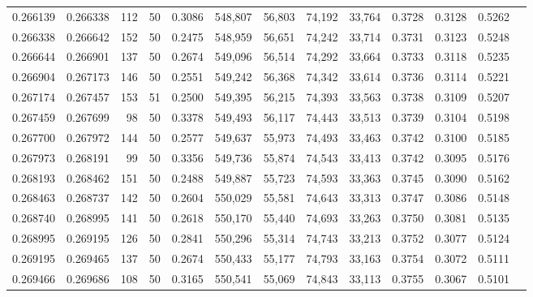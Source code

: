 \begin{tabular}{rrrrrrrrrrrrr}
0.266139 & 0.266338 &   112 &  50 &                                     0.3086 & 548,807 &  56,803 &  74,192 &  33,764 & 0.3728 & 0.3128 & 0.5262 \\
0.266338 & 0.266642 &   152 &  50 &                                     0.2475 & 548,959 &  56,651 &  74,242 &  33,714 & 0.3731 & 0.3123 & 0.5248 \\
0.266644 & 0.266901 &   137 &  50 &                                     0.2674 & 549,096 &  56,514 &  74,292 &  33,664 & 0.3733 & 0.3118 & 0.5235 \\
0.266904 & 0.267173 &   146 &  50 &                                     0.2551 & 549,242 &  56,368 &  74,342 &  33,614 & 0.3736 & 0.3114 & 0.5221 \\
0.267174 & 0.267457 &   153 &  51 &                                     0.2500 & 549,395 &  56,215 &  74,393 &  33,563 & 0.3738 & 0.3109 & 0.5207 \\
0.267459 & 0.267699 &    98 &  50 &                                     0.3378 & 549,493 &  56,117 &  74,443 &  33,513 & 0.3739 & 0.3104 & 0.5198 \\
0.267700 & 0.267972 &   144 &  50 &                                     0.2577 & 549,637 &  55,973 &  74,493 &  33,463 & 0.3742 & 0.3100 & 0.5185 \\
0.267973 & 0.268191 &    99 &  50 &                                     0.3356 & 549,736 &  55,874 &  74,543 &  33,413 & 0.3742 & 0.3095 & 0.5176 \\
0.268193 & 0.268462 &   151 &  50 &                                     0.2488 & 549,887 &  55,723 &  74,593 &  33,363 & 0.3745 & 0.3090 & 0.5162 \\
0.268463 & 0.268737 &   142 &  50 &                                     0.2604 & 550,029 &  55,581 &  74,643 &  33,313 & 0.3747 & 0.3086 & 0.5148 \\
0.268740 & 0.268995 &   141 &  50 &                                     0.2618 & 550,170 &  55,440 &  74,693 &  33,263 & 0.3750 & 0.3081 & 0.5135 \\
0.268995 & 0.269195 &   126 &  50 &                                     0.2841 & 550,296 &  55,314 &  74,743 &  33,213 & 0.3752 & 0.3077 & 0.5124 \\
0.269195 & 0.269465 &   137 &  50 &                                     0.2674 & 550,433 &  55,177 &  74,793 &  33,163 & 0.3754 & 0.3072 & 0.5111 \\
0.269466 & 0.269686 &   108 &  50 &                                     0.3165 & 550,541 &  55,069 &  74,843 &  33,113 & 0.3755 & 0.3067 & 0.5101 \\

\end{tabular}
